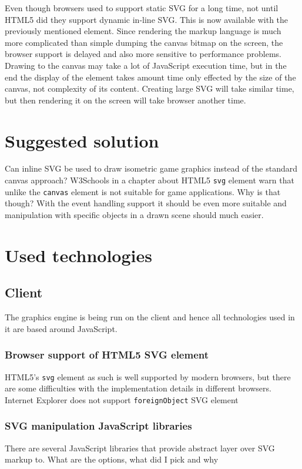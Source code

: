 \documentclass[11pt,oneside, final]{fithesis2}
\begin{document}
Even though browsers used to support static SVG for a long time, not until HTML5 did they support dynamic in-line SVG\cite{w3_html5}. This is now available with the previously mentioned element. Since rendering the markup language is much more complicated than simple dumping the canvas bitmap on the screen, the browser support is delayed and also more sensitive to performance problems. Drawing to the canvas may take a lot of JavaScript execution time, but in the end the display of the element takes amount time only effected by the size of the canvas, not complexity of its content. Creating large SVG will take similar time, but then rendering it on the screen will take browser another time.

\chapter{Suggested solution}
\label{solution}
Can inline SVG be used to draw isometric game graphics instead of the standard canvas approach? W3Schools in a chapter about HTML5 \texttt{svg} element warn that unlike the \texttt{canvas} element is not suitable for game applications\cite{html5svg}. Why is that though? With the event handling support it should be even more suitable and manipulation with specific objects in a drawn scene should much easier.

\chapter{Used technologies}
\label{tech}

\section{Client}
The graphics engine is being run on the client and hence all technologies used in it are based around JavaScript.

\subsection{Browser support of HTML5 SVG element}
HTML5's \texttt{svg} element as such is well supported by modern browsers\cite{html5svg}, but there are some difficulties with the implementation details in different browsers. Internet Explorer does not support \texttt{foreignObject} SVG element\cite{ieforeignobject}

\subsection{SVG manipulation JavaScript libraries}
There are several JavaScript libraries that provide abstract layer over SVG markup to.
What are the options, what did I pick and why
\end{document}
